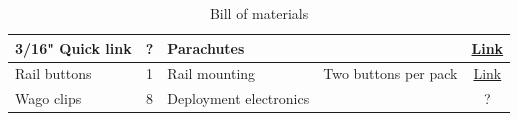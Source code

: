\begin{table}
\begin{tabular}{| p{2in} | c | p{1in} | p{1in} | c |}
        \hline
        3/16" Quick link           & ?        & Parachutes              &                                           & \href{https://www.allrockets.ca/Build/Swivels-Links/Quick-Link-800}{Link}                                                                                                                                                                                                                                                                                                                                                                                                                                                                                                                                     \\
        \hline
        Rail buttons               & 1        & Rail mounting           & Two buttons per pack                      & \href{https://www.allrockets.ca/Build/Rail/Delrin-Rail-Gudes/1010-Airframe}{Link}                                                                                                                                                                                                                                                                                                                                                                                                                                                                                                                             \\
        \hline
        Wago clips                 & 8        & Deployment electronics  &                                           & ?                                                                                                                                                                                                                                                                                                                                                                                                                                                                                                                                                                                                             \\
        \hline
    \end{tabular}
    \caption{Bill of materials}
\end{table}
